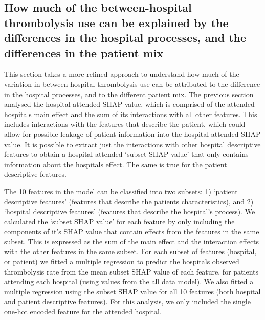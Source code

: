 

\subsection{How much of the between-hospital thrombolysis use can be explained by the differences in the hospital processes, and the differences in the patient mix}%


This section takes a more refined approach to understand how much of the variation in between-hospital thrombolysis use can be attributed to the difference in the hospital processes, and to the different patient mix. The previous section analysed the hospital attended SHAP value, which is comprised of the attended hospitals main effect and the sum of its interactions with all other features. This includes interactions with the features that describe the patient, which could allow for possible leakage of patient information into the hospital attended SHAP value. It is possible to extract just the interactions with other hospital descriptive features to obtain a hospital attended `subset SHAP value' that only contains information about the hospitals effect. The same is true for the patient descriptive features.

The 10 features in the model can be classified into two subsets: 1) `patient descriptive features' (features that describe the patients characteristics), and 2) `hospital descriptive features' (features that describe the hospital’s process). We calculated the `subset SHAP value' for each feature by only including the components of it's SHAP value that contain effects from the features in the same subset. This is expressed as the sum of the main effect and the interaction effects with the other features in the same subset. For each subset of features (hospital, or patient) we fitted a multiple regression to predict the hospitals observed thrombolysis rate from the mean subset SHAP value of each feature, for patients attending each hospital (using values from the all data model). We also fitted a multiple regression using the subset SHAP value for all 10 features (both hospital and patient descriptive features). For this analysis, we only included the single one-hot encoded feature for the attended hospital. 

